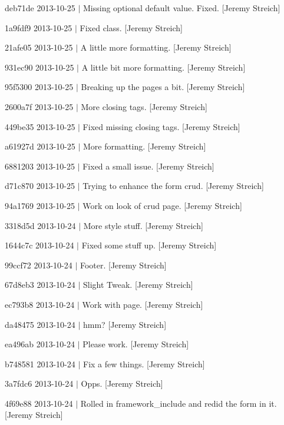 \begin{DoxyItemize}
\item deb71de 2013-\/10-\/25 $|$ Missing optional default value. Fixed. \mbox{[}Jeremy Streich\mbox{]}
\item 1a9fdf9 2013-\/10-\/25 $|$ Fixed class. \mbox{[}Jeremy Streich\mbox{]}
\item 21afe05 2013-\/10-\/25 $|$ A little more formatting. \mbox{[}Jeremy Streich\mbox{]}
\item 931ec90 2013-\/10-\/25 $|$ A little bit more formatting. \mbox{[}Jeremy Streich\mbox{]}
\item 95f5300 2013-\/10-\/25 $|$ Breaking up the pages a bit. \mbox{[}Jeremy Streich\mbox{]}
\item 2600a7f 2013-\/10-\/25 $|$ More closing tags. \mbox{[}Jeremy Streich\mbox{]}
\item 449be35 2013-\/10-\/25 $|$ Fixed missing closing tags. \mbox{[}Jeremy Streich\mbox{]}
\item a61927d 2013-\/10-\/25 $|$ More formatting. \mbox{[}Jeremy Streich\mbox{]}
\item 6881203 2013-\/10-\/25 $|$ Fixed a small issue. \mbox{[}Jeremy Streich\mbox{]}
\item d71c870 2013-\/10-\/25 $|$ Trying to enhance the form crud. \mbox{[}Jeremy Streich\mbox{]}
\item 94a1769 2013-\/10-\/25 $|$ Work on look of crud page. \mbox{[}Jeremy Streich\mbox{]}
\item 3318d5d 2013-\/10-\/24 $|$ More style stuff. \mbox{[}Jeremy Streich\mbox{]}
\item 1644c7c 2013-\/10-\/24 $|$ Fixed some stuff up. \mbox{[}Jeremy Streich\mbox{]}
\item 99ccf72 2013-\/10-\/24 $|$ Footer. \mbox{[}Jeremy Streich\mbox{]}
\item 67d8eb3 2013-\/10-\/24 $|$ Slight Tweak. \mbox{[}Jeremy Streich\mbox{]}
\item ec793b8 2013-\/10-\/24 $|$ Work with page. \mbox{[}Jeremy Streich\mbox{]}
\item da48475 2013-\/10-\/24 $|$ hmm? \mbox{[}Jeremy Streich\mbox{]}
\item ea496ab 2013-\/10-\/24 $|$ Please work. \mbox{[}Jeremy Streich\mbox{]}
\item b748581 2013-\/10-\/24 $|$ Fix a few things. \mbox{[}Jeremy Streich\mbox{]}
\item 3a7fdc6 2013-\/10-\/24 $|$ Opps. \mbox{[}Jeremy Streich\mbox{]}
\item 4f69e88 2013-\/10-\/24 $|$ Rolled in framework\-\_\-include and redid the form in it. \mbox{[}Jeremy Streich\mbox{]}

\end{DoxyItemize}
